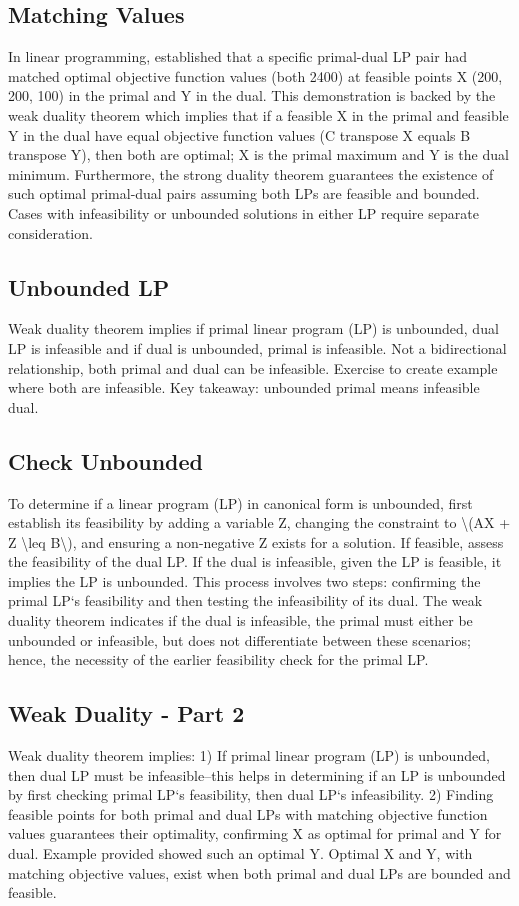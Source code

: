 \subsection*{Matching Values}
In linear programming, established that a specific primal-dual LP pair had matched optimal objective function values (both 2400) at feasible points X (200, 200, 100) in the primal and Y in the dual.
This demonstration is backed by the weak duality theorem which implies that if a feasible X in the primal and feasible Y in the dual have equal objective function values (C transpose X equals B transpose Y), then both are optimal; X is the primal maximum and Y is the dual minimum.
Furthermore, the strong duality theorem guarantees the existence of such optimal primal-dual pairs assuming both LPs are feasible and bounded.
Cases with infeasibility or unbounded solutions in either LP require separate consideration.

\subsection*{Unbounded LP}
Weak duality theorem implies if primal linear program (LP) is unbounded, dual LP is infeasible and if dual is unbounded, primal is infeasible.
Not a bidirectional relationship, both primal and dual can be infeasible.
Exercise to create example where both are infeasible.
Key takeaway: unbounded primal means infeasible dual.

\subsection*{Check Unbounded}
To determine if a linear program (LP) in canonical form is unbounded, first establish its feasibility by adding a variable Z, changing the constraint to \textbackslash{}(AX + Z \textbackslash{}leq B\textbackslash{}), and ensuring a non-negative Z exists for a solution.
If feasible, assess the feasibility of the dual LP\@.
If the dual is infeasible, given the LP is feasible, it implies the LP is unbounded.
This process involves two steps: confirming the primal LP`s feasibility and then testing the infeasibility of its dual.
The weak duality theorem indicates if the dual is infeasible, the primal must either be unbounded or infeasible, but does not differentiate between these scenarios; hence, the necessity of the earlier feasibility check for the primal LP\@.

\subsection*{Weak Duality - Part 2}
Weak duality theorem implies: 1) If primal linear program (LP) is unbounded, then dual LP must be infeasible--this helps in determining if an LP is unbounded by first checking primal LP`s feasibility, then dual LP`s infeasibility.
2) Finding feasible points for both primal and dual LPs with matching objective function values guarantees their optimality, confirming X as optimal for primal and Y for dual.
Example provided showed such an optimal Y\@.
Optimal X and Y, with matching objective values, exist when both primal and dual LPs are bounded and feasible.

